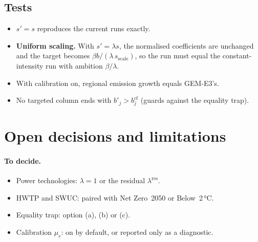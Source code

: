 \documentclass[11pt,a4paper]{article}
\begin{document}
\subsection{Tests}
\begin{itemize}
  \item $s' = s$ reproduces the current runs exactly.
  \item \textbf{Uniform scaling.} With $s' = \lambda s$, the normalised
        coefficients are unchanged and the target becomes
        $\beta b/(\lambda\, s_{\text{scale}})$, so the run must equal the
        constant-intensity run with ambition $\beta/\lambda$.
  \item With calibration on, regional emission growth equals GEM-E3's.
  \item No targeted column ends with $b'_j > b^{\mathrm{cf}}_j$ (guards
        against the equality trap).
\end{itemize}

\section{Open decisions and limitations}

\paragraph{To decide.}
\begin{itemize}
  \item Power technologies: $\lambda = 1$ or the residual $\lambda^{\mathrm{res}}$.
  \item HWTP and SWUC: paired with Net Zero~2050 or Below~2\,°C.
  \item Equality trap: option (a), (b) or (c).
  \item Calibration $\mu_r$: on by default, or reported only as a diagnostic.
\end{itemize}
\end{document}
